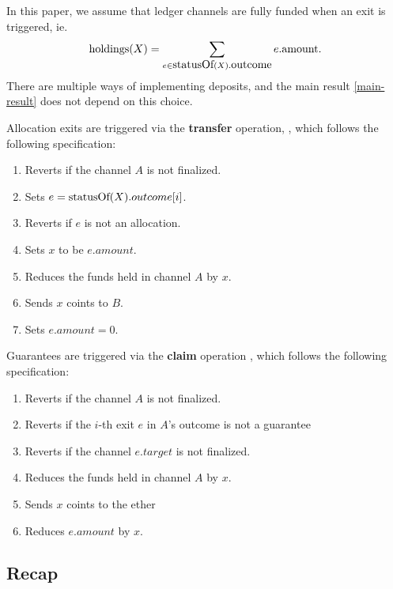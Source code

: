 
In this paper, we assume that ledger channels are fully funded when an exit is triggered, ie. $$\mbox{holdings}(X) = \sum_{e\in \mbox{statusOf}(X).\mbox{outcome}} e.\mbox{amount}.$$ There are multiple ways of implementing deposits, and the main result \ref{main-result} does not depend on this choice.

Allocation exits are triggered via the \textbf{transfer} operation, , which follows the following specification:
\begin{enumerate}
  \item Reverts if the channel $A$ is not finalized.
  \item Sets $e = \mbox{statusOf}(X).outcome[i]$.
  \item Reverts if $e$ is not an allocation.
  \item Sets $x$ to be $e.amount$.
  \item Reduces the funds held in channel $A$ by $x$. 
  \item Sends $x$ coints to $B$.
  \item Sets $e.amount = 0$.
\end{enumerate} 

Guarantees are triggered via the \textbf{claim} operation , which follows the following specification:
\begin{enumerate}
  \item Reverts if the channel $A$ is not finalized.
  \item Reverts if the $i$-th exit $e$ in $A$'s outcome is not a guarantee
  \item Reverts if the channel $e.target$ is not finalized.
  \item Reduces the funds held in channel $A$ by $x$. 
  \item Sends $x$ coints to the ether
  \item Reduces $e.amount$ by $x$.
\end{enumerate} 


\subsection{Recap}
